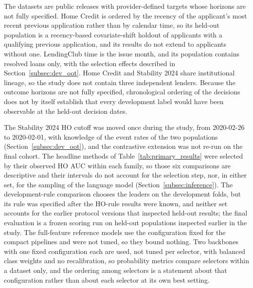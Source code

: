 \documentclass[final,5p,twocolumn]{elsarticle}
\begin{document}
The datasets are public releases with provider-defined targets whose horizons are not fully specified. Home Credit is ordered by the recency of the applicant's most recent previous application rather than by calendar time, so its held-out population is a recency-based covariate-shift holdout of applicants with a qualifying previous application, and its results do not extend to applicants without one. LendingClub time is the issue month, and its population contains resolved loans only, with the selection effects described in Section~\ref{subsec:dev_oot}. Home Credit and Stability 2024 share institutional lineage, so the study does not contain three independent lenders. Because the outcome horizons are not fully specified, chronological ordering of the decisions does not by itself establish that every development label would have been observable at the held-out decision dates.

The Stability 2024 HO cutoff was moved once during the study, from 2020-02-26 to 2020-02-01, with knowledge of the event rates of the two populations (Section~\ref{subsec:dev_oot}), and the contrastive extension was not re-run on the final cohort. The headline methods of Table~\ref{tab:primary_results} were selected by their observed HO AUC within each family, so those six comparisons are descriptive and their intervals do not account for the selection step, nor, in either set, for the sampling of the language model (Section~\ref{subsec:inference}). The development-rule comparison chooses the leaders on the development folds, but its rule was specified after the HO-rule results were known, and neither set accounts for the earlier protocol versions that inspected held-out results; the final evaluation is a frozen scoring run on held-out populations inspected earlier in the study. The full-feature reference models use the configuration fixed for the compact pipelines and were not tuned, so they bound nothing. Two backbones with one fixed configuration each are used, not tuned per selector, with balanced class weights and no recalibration, so probability metrics compare selectors within a dataset only, and the ordering among selectors is a statement about that configuration rather than about each selector at its own best setting.
\end{document}
